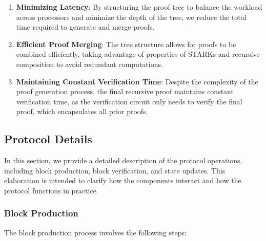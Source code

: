 \documentclass{article}
\theoremstyle{plain}
\theoremstyle{definition}
\theoremstyle{remark}
\theoremstyle{problem}
\begin{document}
\begin{enumerate}
    \item \textbf{Minimizing Latency}: By structuring the proof tree to balance the workload across processors and minimize the depth of the tree, we reduce the total time required to generate and merge proofs.

    \item \textbf{Efficient Proof Merging}: The tree structure allows for proofs to be combined efficiently, taking advantage of properties of STARKs and recursive composition to avoid redundant computations.

    \item \textbf{Maintaining Constant Verification Time}: Despite the complexity of the proof generation process, the final recursive proof maintains constant verification time, as the verification circuit only needs to verify the final proof, which encapsulates all prior proofs.
\end{enumerate}

\subsection{Protocol Details}

In this section, we provide a detailed description of the protocol operations, including block production, block verification, and state updates. This elaboration is intended to clarify how the components interact and how the protocol functions in practice.

\subsubsection{Block Production}

The block production process involves the following steps:
\end{document}
